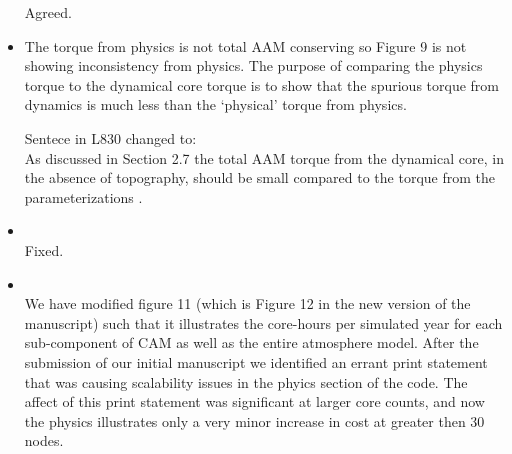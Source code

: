 \documentclass[11pt]{article}
\begin{document}
\begin{itemize}
Agreed.

\item {\color{blue}{L830-835: What is the expectation for the physical torque? Is the observed wind torque consistent with AAM variations of the atmosphere, or does Fig.9 show some inconsistency in the physics?}}

The torque from physics is not total AAM conserving so Figure 9 is not showing inconsistency from physics. The purpose of comparing the physics torque to the dynamical core torque is to show that the spurious torque from dynamics is much less than the `physical' torque from physics.

Sentece in L830 changed to:\\

As discussed in Section 2.7 the total AAM torque from the dynamical core, in the absence of topography, should be small {\color{blue}{(ideally zero)}} compared to the torque from the parameterizations {\color{blue}{which is not spurious}}.

\item {\color{blue}{L873: ... cores/node. The x-axis ...}}\\

Fixed.

\item {\color{blue}{L905-907: Fig. 11 shows that the fraction of the dycore costs is reduced for higher node numbers, as a result of the ``super-scaling'' illustrated in Fig. 10. Then other fractions must increase as the total relative costs = 1 is constant. Therefore from Fig.11 - without more information - we cannot learn if physics costs have remained constant (=''perfect scaling'') or possibly changed. The same holds for the other parts. My suggestion is to replace Fig.11 by a new figure that shows the costs of each part (I/O, dynamics, phyiscs \# dynamics, physics) similar as in Figure 10, with costs scaled by the costs of the 5-node setup of the CAM-SE. Additionally a line for the costs of the ``whole model'' should be shown for completeness.}}\\

We have modified figure 11 (which is Figure 12 in the new version of the manuscript) such that it illustrates the core-hours per simulated year for each sub-component of CAM as well as the entire atmosphere model. After the submission of our initial manuscript we identified an errant print statement that was causing scalability issues in the phyics section of the code. The affect of this print statement was significant at larger core counts, and now the physics illustrates only a very minor increase in cost at greater then 30 nodes.\\


\end{itemize}
\end{document}
